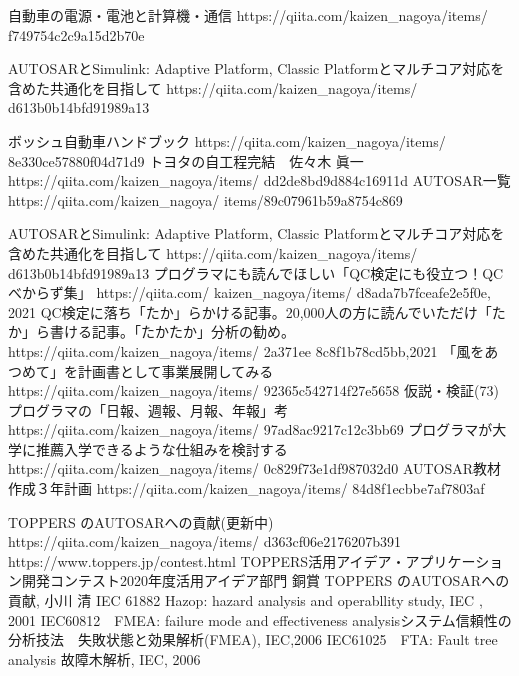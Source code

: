 \documentclass[twocolumn]{article} %
\begin{document}
\begin{thebibliography}{99}
 自動車の電源・電池と計算機・通信
https://qiita.com/kaizen\_nagoya/items/
f749754c2c9a15d2b70e


AUTOSARとSimulink: Adaptive Platform, Classic Platformとマルチコア対応を含めた共通化を目指して
https://qiita.com/kaizen\_nagoya/items/
d613b0b14bfd91989a13

ボッシュ自動車ハンドブック
https://qiita.com/kaizen\_nagoya/items/
8e330ce57880f04d71d9
トヨタの自工程完結　佐々木 眞一
https://qiita.com/kaizen\_nagoya/items/
dd2de8bd9d884c16911d
AUTOSAR一覧
https://qiita.com/kaizen\_nagoya/
items/89c07961b59a8754c869

AUTOSARとSimulink: Adaptive Platform, Classic Platformとマルチコア対応を含めた共通化を目指して
https://qiita.com/kaizen\_nagoya/items/
d613b0b14bfd91989a13
 プログラマにも読んでほしい「QC検定にも役立つ！QCべからず集」
https://qiita.com/ kaizen\_nagoya/items/
d8ada7b7fceafe2e5f0e, 2021
 QC検定に落ち「たか」らかける記事。20,000人の方に読んでいただけ「たか」ら書ける記事。「たかたか」分析の勧め。 https://qiita.com/kaizen\_nagoya/items/
2a371ee 8c8f1b78cd5bb,2021
 「風をあつめて」を計画書として事業展開してみる 
https://qiita.com/kaizen\_nagoya/items/
92365c542714f27e5658
 仮説・検証(73)プログラマの「日報、週報、月報、年報」考 
https://qiita.com/kaizen\_nagoya/items/
97ad8ac9217c12c3bb69
 プログラマが大学に推薦入学できるような仕組みを検討する 
https://qiita.com/kaizen\_nagoya/items/
0c829f73e1df987032d0
 AUTOSAR教材作成３年計画 
https://qiita.com/kaizen\_nagoya/items/
84d8f1ecbbe7af7803af

 TOPPERS のAUTOSARへの貢献(更新中)
https://qiita.com/kaizen\_nagoya/items/
d363cf06e2176207b391
 https://www.toppers.jp/contest.html
TOPPERS活用アイデア・アプリケーション開発コンテスト2020年度活用アイデア部門 銅賞
TOPPERS のAUTOSARへの貢献, 小川 清
 IEC 61882 Hazop: hazard analysis and operabllity study, IEC , 2001
 IEC60812　FMEA: failure mode and effectiveness analysisシステム信頼性の分析技法　失敗状態と効果解析(FMEA), IEC,2006
 IEC61025　FTA: Fault tree analysis 故障木解析, IEC, 2006
\end{thebibliography}
\end{document}
